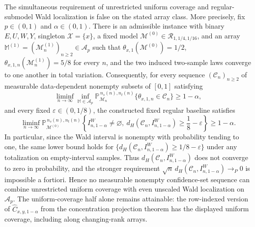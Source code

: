 The simultaneous requirement of unrestricted uniform coverage and regular-submodel Wald localization is false on the stated array class. More precisely, fix \(p\in(0,1)\) and \(\alpha\in(0,1)\). There is an admissible instance with binary \(E,U,W,Y\), singleton \(\mathcal X=\{x\}\), a fixed model \(\mathcal M^{(0)}\in\mathcal R_{1,1/4,1/16}\), and an array \(\mathbb M^{(1)}=(\mathcal M^{(1)}_n)_{n\ge2}\in\mathcal A_p\) such that \(\theta_{x,1}(\mathcal M^{(0)})=1/2\), \(\theta_{x,1,n}(\mathcal M^{(1)}_n)=5/8\) for every \(n\), and the two induced two-sample laws converge to one another in total variation. Consequently, for every sequence \((\mathcal C_n)_{n\ge2}\) of measurable data-dependent nonempty subsets of \([0,1]\) satisfying
\[
\liminf_{n\to\infty}\inf_{\mathbb M\in\mathcal A_p}
\mathbb P_{\mathcal M_n}^{\,n_s(n),n_t(n)}
\{\theta_{x,1,n}\in\mathcal C_n\}
\ge 1-\alpha,
\]
and every fixed \(\varepsilon\in(0,1/8)\), the constructed fixed regular baseline satisfies
\[
\liminf_{n\to\infty}
\mathbb P_{\mathcal M^{(0)}}^{\,n_s(n),n_t(n)}
\left\{I^W_{n,1-\alpha}\ne\varnothing,\ 
d_H\!\left(\mathcal C_n,I^W_{n,1-\alpha}\right)
\ge\frac18-\varepsilon\right\}
\ge1-\alpha.
\]
In particular, since the Wald interval is nonempty with probability tending to one, the same lower bound holds for \(\{d_H(\mathcal C_n,I^W_{n,1-\alpha})\ge1/8-\varepsilon\}\) under any totalization on empty-interval samples. Thus \(d_H(\mathcal C_n,I^W_{n,1-\alpha})\) does not converge to zero in probability, and the stronger requirement \(\sqrt n\,d_H(\mathcal C_n,I^W_{n,1-\alpha})\longrightarrow_P0\) is impossible a fortiori. Hence no measurable nonempty confidence-set sequence can combine unrestricted uniform coverage with even unscaled Wald localization on \(\mathcal A_p\). The uniform-coverage half alone remains attainable: the row-indexed version of \(\widehat C_{x,y,1-\alpha}\) from the concentration projection theorem has the displayed uniform coverage, including along changing-rank arrays.